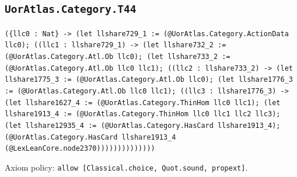 \documentclass[11pt]{article}
\begin{document}
\subsection*{\texttt{UorAtlas.Category.T44}}
\noindent\texttt{(\{llc0 : Nat\} -> (let llshare729\_1 := (@UorAtlas.Category.ActionData llc0); ((llc1 : llshare729\_1) -> (let llshare732\_2 := (@UorAtlas.Category.Atl.Ob llc0); (let llshare733\_2 := (@UorAtlas.Category.Atl.Ob llc0 llc1); ((llc2 : llshare733\_2) -> (let llshare1775\_3 := (@UorAtlas.Category.Atl.Ob llc0); (let llshare1776\_3 := (@UorAtlas.Category.Atl.Ob llc0 llc1); ((llc3 : llshare1776\_3) -> (let llshare1627\_4 := (@UorAtlas.Category.ThinHom llc0 llc1); (let llshare1913\_4 := (@UorAtlas.Category.ThinHom llc0 llc1 llc2 llc3); (let llshare12935\_4 := (@UorAtlas.Category.HasCard llshare1913\_4); (@UorAtlas.Category.HasCard llshare1913\_4 (@LexLeanCore.node2370))))))))))))))}\par
\noindent Axiom policy: \texttt{allow [Classical.choice, Quot.sound, propext]}.\par
\end{document}
